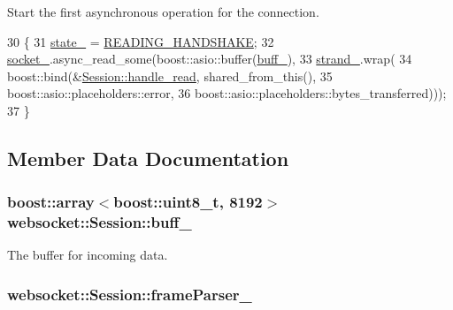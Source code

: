 Start the first asynchronous operation for the connection. 


\begin{DoxyCode}
30             \{
31                 \hyperlink{classwebsocket_1_1Session_a8f9e0d65f4de675dd7b8242e17ee29b7}{state\_} = \hyperlink{classwebsocket_1_1Session_a643e11bb9d05b580f20ff232f3582c1ba3b14b5a3d2ab8b61422448f7464a5d4a}{READING\_HANDSHAKE};          
32                 \hyperlink{classwebsocket_1_1Session_a7e7771fef3f105f4019ef9a1c2f04eb5}{socket\_}.async\_read\_some(boost::asio::buffer(\hyperlink{classwebsocket_1_1Session_a4a7ca92db9c843899fbf3673fe5b9f52}{buff\_}),
33                     \hyperlink{classwebsocket_1_1Session_a394bb9b578c166e22b2a630b8ea013fb}{strand\_}.wrap(
34                     boost::bind(&\hyperlink{classwebsocket_1_1Session_ad23257dd2bffa48e90ed9941d39ca56b}{Session::handle\_read}, shared\_from\_this(),
35                     boost::asio::placeholders::error,
36                     boost::asio::placeholders::bytes\_transferred)));
37             \}
\end{DoxyCode}


\subsection{Member Data Documentation}
\subsubsection[{\texorpdfstring{buff\+\_\+}{buff_}}]{\setlength{\rightskip}{0pt plus 5cm}boost\+::array$<$boost\+::uint8\+\_\+t, 8192$>$ websocket\+::\+Session\+::buff\+\_\+\hspace{0.3cm}{\ttfamily [private]}}\hypertarget{classwebsocket_1_1Session_a4a7ca92db9c843899fbf3673fe5b9f52}{}\label{classwebsocket_1_1Session_a4a7ca92db9c843899fbf3673fe5b9f52}


The buffer for incoming data. 

\subsubsection[{\texorpdfstring{frame\+Parser\+\_\+}{frameParser_}}]{ websocket\+::\+Session\+::frame\+Parser\+\_\+\hspace{0.3cm}{\ttfamily [private]}}\hypertarget{classwebsocket_1_1Session_add7f041fe3badd9bea5158a412d4c33b}{}\label{classwebsocket_1_1Session_add7f041fe3badd9bea5158a412d4c33b}


